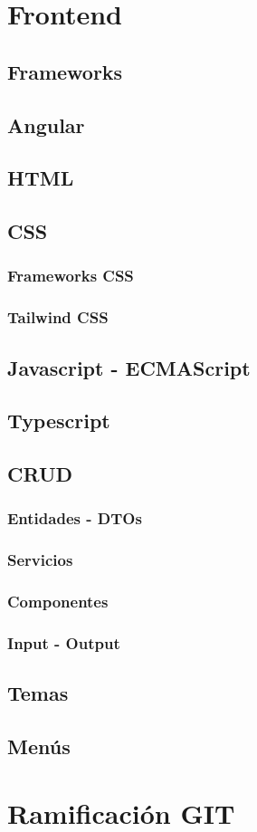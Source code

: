\section{Frontend}
\subsection{Frameworks}
\subsection{Angular}
\subsection{HTML}
\subsection{CSS}
\subsubsection{Frameworks CSS}
\subsubsection{Tailwind CSS}
\subsection{Javascript - ECMAScript}
\subsection{Typescript}
\subsection{CRUD}
\subsubsection{Entidades - DTOs}
\subsubsection{Servicios}
\subsubsection{Componentes}
\subsubsection{Input - Output}
\subsection{Temas}
\subsection{Menús}
\section{Ramificación GIT}





